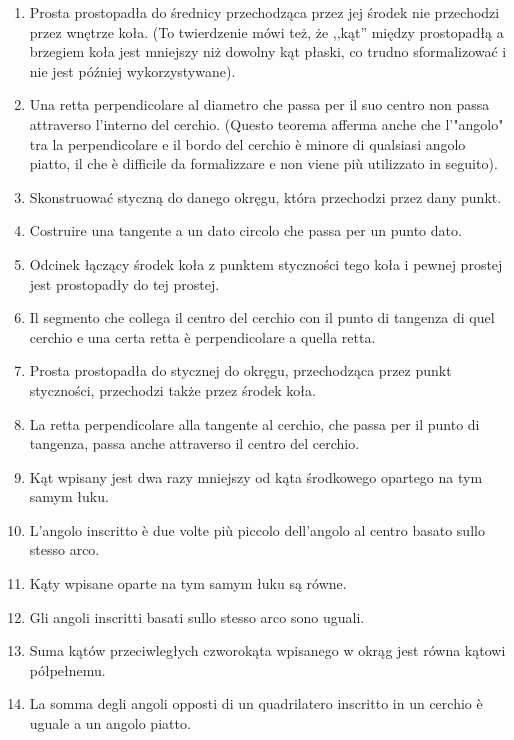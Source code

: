 \begin{enumerate}
    \item [3.16] Prosta prostopadła do średnicy przechodząca przez jej środek nie przechodzi przez wnętrze koła. (To twierdzenie mówi też, że ,,kąt'' między prostopadłą a brzegiem koła jest mniejszy niż dowolny kąt płaski, co trudno sformalizować i nie jest później wykorzystywane). %
    \item [3.16] Una retta perpendicolare al diametro che passa per il suo centro non passa attraverso l'interno del cerchio. (Questo teorema afferma anche che l'"angolo" tra la perpendicolare e il bordo del cerchio è minore di qualsiasi angolo piatto, il che è difficile da formalizzare e non viene più utilizzato in seguito). %

    \item [3.17] Skonstruować styczną do danego okręgu, która przechodzi przez dany punkt. %
    \item [3.17] Costruire una tangente a un dato circolo che passa per un punto dato. %

    \item [3.18] Odcinek łączący środek koła z punktem styczności tego koła i pewnej prostej jest prostopadły do tej prostej. %
    \item [3.18] Il segmento che collega il centro del cerchio con il punto di tangenza di quel cerchio e una certa retta è perpendicolare a quella retta. %

    \item [3.19] Prosta prostopadła do stycznej do okręgu, przechodząca przez punkt styczności, przechodzi także przez środek koła. %
    \item [3.19] La retta perpendicolare alla tangente al cerchio, che passa per il punto di tangenza, passa anche attraverso il centro del cerchio. %

    \item [3.20] Kąt wpisany jest dwa razy mniejszy od kąta środkowego opartego na tym samym łuku. %
    \item [3.20] L'angolo inscritto è due volte più piccolo dell'angolo al centro basato sullo stesso arco. %

    \item [3.21] Kąty wpisane oparte na tym samym łuku są równe. %
    \item [3.21] Gli angoli inscritti basati sullo stesso arco sono uguali. %

    \item [3.22] Suma kątów przeciwległych czworokąta wpisanego w okrąg jest równa kątowi półpełnemu. %
    \item [3.22] La somma degli angoli opposti di un quadrilatero inscritto in un cerchio è uguale a un angolo piatto. %


\end{enumerate}
